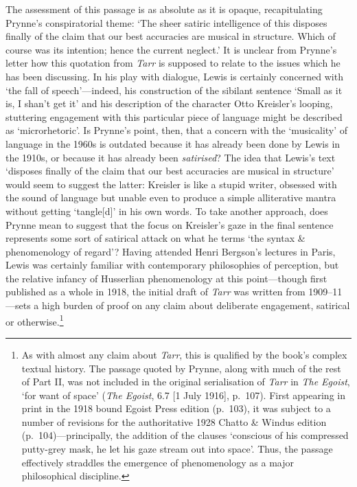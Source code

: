\documentclass[]{article}
\begin{document}
\noindent The assessment of this passage is as absolute as it is opaque,
recapitulating Prynne's conspiratorial theme: `The sheer satiric
intelligence of this disposes finally of the claim that our best
accuracies are musical in structure. Which of course was its intention;
hence the current neglect.' It is unclear from Prynne's letter how this
quotation from \emph{Tarr} is supposed to relate to the issues which he
has been discussing. In his play with dialogue, Lewis is certainly
concerned with `the fall of speech'---indeed, his construction of the
sibilant sentence `Small as it is, I shan't get it' and his description
of the character Otto Kreisler's looping, stuttering engagement with
this particular piece of language might be described as `microrhetoric'.
Is Prynne's point, then, that a concern with the `musicality' of
language in the 1960s is outdated because it has already been done by
Lewis in the 1910s, or because it has already been \emph{satirised}? The
idea that Lewis's text `disposes finally of the claim that our best
accuracies are musical in structure' would seem to suggest the latter:
Kreisler is like a stupid writer, obsessed with the sound of language
but unable even to produce a simple alliterative mantra without getting
`tangle{[}d{]}' in his own words. To take another approach, does Prynne
mean to suggest that the focus on Kreisler's gaze in the final sentence
represents some sort of satirical attack on what he terms `the syntax \&
phenomenology of regard'? Having attended Henri Bergson's lectures in
Paris, Lewis was certainly familiar with contemporary philosophies of
perception, but the relative infancy of Husserlian phenomenology at this
point---though first published as a whole in 1918, the initial draft of
\emph{Tarr} was written from 1909--11---sets a high burden of proof on
any claim about deliberate engagement, satirical or otherwise.\footnote{As
  with almost any claim about \emph{Tarr}, this is qualified by the
  book's complex textual history. The passage quoted by Prynne, along
  with much of the rest of Part II, was not included in the original
  serialisation of \emph{Tarr} in \emph{The Egoist}, `for want of space'
  (\emph{The Egoist}, 6.7 {[}1 July 1916{]}, p.~107). First appearing in
  print in the 1918 bound Egoist Press edition (p.~103), it was subject
  to a number of revisions for the authoritative 1928 Chatto \& Windus
  edition (p.~104)---principally, the addition of the clauses `conscious
  of his compressed putty-grey mask, he let his gaze stream out into
  space'. Thus, the passage effectively straddles the emergence of
  phenomenology as a major philosophical discipline.}
\end{document}
